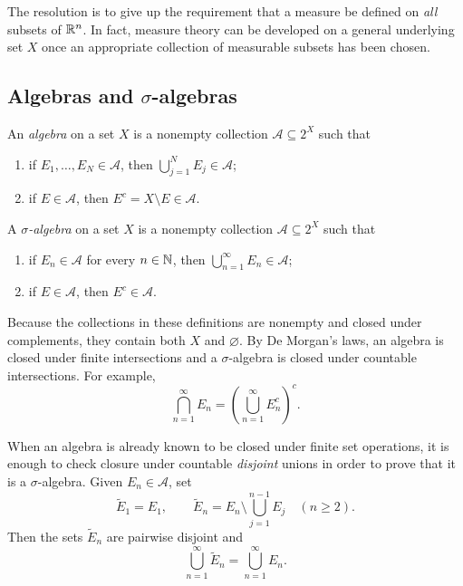 The resolution is to give up the requirement that a measure be defined on
\emph{all} subsets of $\mathbb{R}^n$. In fact, measure theory can be developed
on a general underlying set $X$ once an appropriate collection of
measurable subsets has been chosen.

\subsection{Algebras and \texorpdfstring{$\sigma$}{sigma}-algebras}

\begin{definition}[Algebra]
  An \emph{algebra} on a set $X$ is a nonempty collection
  $\mathcal A\subseteq 2^X$ such that
  \begin{enumerate}[label=(\alph*)]
    \item if $E_1,\ldots,E_N\in\mathcal A$, then
      $\bigcup_{j=1}^N E_j\in\mathcal A$;
    \item if $E\in\mathcal A$, then $E^c=X\setminus E\in\mathcal A$.
  \end{enumerate}
\end{definition}

\begin{definition}
  A \emph{$\sigma$-algebra} on a set $X$ is a nonempty collection
  $\mathcal A\subseteq 2^X$ such that
  \begin{enumerate}[label=(\alph*)]
    \item if $E_n\in\mathcal A$ for every $n\in\mathbb{N}$, then
      $\bigcup_{n=1}^{\infty}E_n\in\mathcal A$;
    \item if $E\in\mathcal A$, then $E^c\in\mathcal A$.
  \end{enumerate}
\end{definition}

Because the collections in these definitions are nonempty and closed under
complements, they contain both $X$ and $\varnothing$. By De Morgan's laws,
an algebra is closed under finite intersections and a $\sigma$-algebra is
closed under countable intersections. For example,
\[
  \bigcap_{n=1}^{\infty}E_n
  =\left(\bigcup_{n=1}^{\infty}E_n^c\right)^c.
\]

When an algebra is already known to be closed under finite set operations,
it is enough to check closure under countable \emph{disjoint} unions in
order to prove that it is a $\sigma$-algebra. Given $E_n\in\mathcal A$, set
\[
  \widetilde E_1=E_1,
  \qquad
  \widetilde E_n=E_n\setminus\bigcup_{j=1}^{n-1}E_j
  \quad(n\geq2).
\]
Then the sets $\widetilde E_n$ are pairwise disjoint and
\[
  \bigcup_{n=1}^{\infty}\widetilde E_n
  =\bigcup_{n=1}^{\infty}E_n.
\]

